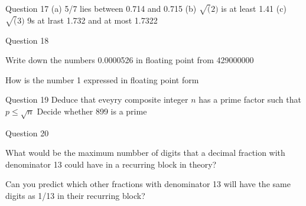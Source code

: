\documentclass{article}
\begin{document}
Question 17
(a) 5/7 lies between 0.714 and 0.715
(b) $\sqrt(2)$ is at least 1.41
(c) $\sqrt(3)$  9s at lrast 1.732 and at most 1.7322

Question 18 

Write down the numbers 0.0000526 in floating point from
429000000

How is the number 1 expressed in floating point form

Question 19
Deduce that eveyry composite integer $n$ has a prime factor such that $p \leq \sqrt{n}$
Decide whether 899 is a prime

Question 20

What would be the maximum numbber of digits that a decimal fraction with denominator 13 
could have in a recurring block in theory?

Can you predict which other fractions with denominator 13 will have the same digits as 1/13 in their recurring block?
\end{document}
